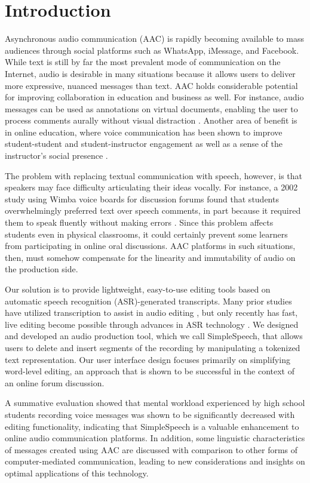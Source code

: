 \section{Introduction}

Asynchronous audio communication (AAC) is rapidly becoming available to mass audiences through social platforms such as WhatsApp, iMessage, and Facebook. 
While text is still by far the most prevalent mode of communication on the Internet, audio is desirable in many situations because it allows users to deliver more expressive, nuanced messages than text.
AAC holds considerable potential for improving collaboration in education and business as well. 
For instance, audio messages can be used as annotations on virtual documents, enabling the user to process comments aurally without visual distraction \cite{yoon}.
Another area of benefit is in online education, where voice communication has been shown to improve student-student and student-instructor engagement as well as a sense of the instructor's social presence \cite{ice,oomen,tu}. 

The problem with replacing textual communication with speech, however, is that speakers may face difficulty articulating their ideas vocally.
For instance, a 2002 study using Wimba voice boards for discussion forums found that students overwhelmingly preferred text over speech comments, in part because it required them to speak fluently without making errors \cite{wimba}.
Since this problem affects students even in physical classrooms, it could certainly prevent some learners from participating in online oral discussions.
AAC platforms in such situations, then, must somehow compensate for the linearity and immutability of audio on the production side.

Our solution is to provide lightweight, easy-to-use editing tools based on automatic speech recognition (ASR)-generated transcripts.
Many prior studies have utilized transcription to assist in audio editing \cite{casares,rubin,whittaker_semantic}, but only recently has fast, live editing become possible through advances in ASR technology \cite{baker,saon}.
We designed and developed an audio production tool, which we call SimpleSpeech, that allows users to delete and insert segments of the recording by manipulating a tokenized text representation. 
Our user interface design focuses primarily on simplifying word-level editing, an approach that is shown to be successful in the context of an online forum discussion.

A summative evaluation showed that mental workload experienced by high school students recording voice messages was shown to be significantly decreased with editing functionality, indicating that SimpleSpeech is a valuable enhancement to online audio communication platforms.
In addition, some linguistic characteristics of messages created using AAC are discussed with comparison to other forms of computer-mediated communication, leading to new considerations and insights on optimal applications of this technology.